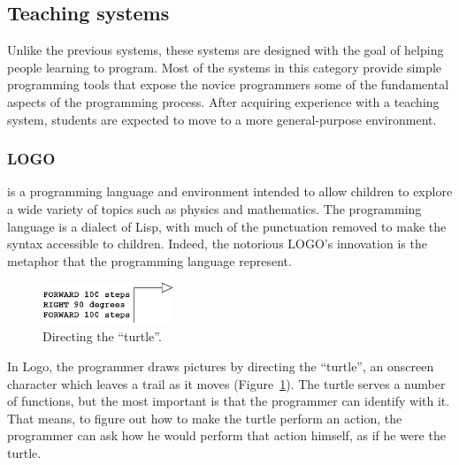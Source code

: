 \subsection{Teaching systems}
\label{sec:ts}

Unlike the previous systems, these systems are designed with the goal of helping people learning to program. Most of the systems in this category provide simple programming tools that expose the novice programmers some of the fundamental aspects of the programming process. After acquiring experience with a teaching system, students are expected to move to a more general-purpose environment. 

\subsubsection{LOGO~\cite{papert1980mindstorms}} is a programming language and environment intended to allow children to explore a wide variety of topics such as physics and mathematics. The programming language is a dialect of Lisp, with much of the punctuation removed to make the syntax accessible to children. Indeed, the notorious LOGO's innovation is the metaphor that the programming language represent.

\begin{figure}
  \vspace{-15pt}
  \begin{center}
    \includegraphics[width=0.35\textwidth]{img/turtle}
  \end{center}
  \vspace{-20pt}
 \caption{Directing the ``turtle''.}  
  \vspace{-20pt}
    \label{fig:turtle}
\end{figure}

In Logo, the programmer draws pictures by directing the ``turtle'', an onscreen character which leaves a trail as it moves (Figure~\ref{fig:turtle}). The turtle serves a number of functions, but the most important is that the programmer can identify with it. That means, to figure out how to make the turtle perform an action, the programmer can ask how he would perform that action himself, as if he were the turtle.

